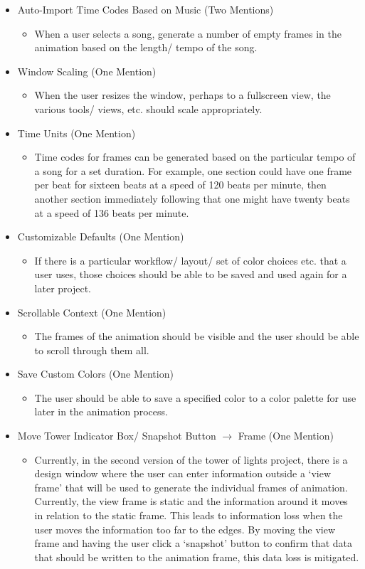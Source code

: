 \documentclass[./spec.tex]{subfiles}
\begin{document}
{\begin{itemize}
	\item Auto-Import Time Codes Based on Music (Two Mentions)
	\begin{itemize}
		\item When a user selects a song, generate a number of empty frames in the animation based on the length/ tempo of the song.
	\end{itemize}
	\item Window Scaling (One Mention)
	\begin{itemize}
		\item When the user resizes the window, perhaps to a fullscreen view, the various tools/ views, etc. should scale appropriately.
	\end{itemize}
	\item Time Units (One Mention)
	\begin{itemize}
		\item Time codes for frames can be generated based on the particular tempo of a song for a set duration. For example, one section could have one frame per beat for sixteen beats at a speed of 120 beats per minute, then another section immediately following that one might have twenty beats at a speed of 136 beats per minute.
	\end{itemize}
	\item Customizable Defaults (One Mention)
	\begin{itemize}
		\item If there is a particular workflow/ layout/ set of color choices etc. that a user uses, those choices should be able to be saved and used again for a later project.
	\end{itemize}
	\item Scrollable Context (One Mention)
	\begin{itemize}
		\item The frames of the animation should be visible and the user should be able to scroll through them all.
	\end{itemize}
	\item Save Custom Colors (One Mention)
	\begin{itemize}
		\item The user should be able to save a specified color to a color palette for use later in the animation process.
	\end{itemize}
	\item Move Tower Indicator Box/ Snapshot Button $\rightarrow$ Frame (One Mention)
	\begin{itemize}
		\item Currently, in the second version of the tower of lights project, there is a design window where the user can enter information outside a `view frame' that will be used to generate the individual frames of animation. Currently, the view frame is static and the information around it moves in relation to the static frame. This leads to information loss when the user moves the information too far to the edges. By moving the view frame and having the user click a `snapshot' button to confirm that data that should be written to the animation frame, this data loss is mitigated.

\end{itemize}
\end{itemize}}
\end{document}
